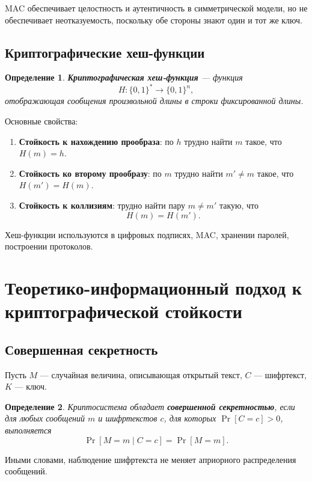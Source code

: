 \documentclass[12pt,a4paper]{article}
\newtheorem{definition}{Определение}
\begin{document}
MAC обеспечивает целостность и аутентичность в симметрической модели, но не обеспечивает неотказуемость, поскольку обе стороны знают один и тот же ключ.

\subsection{Криптографические хеш-функции}

\begin{definition}
\textbf{Криптографическая хеш-функция} --- функция
\[
    H : \{0,1\}^* \to \{0,1\}^n,
\]
отображающая сообщения произвольной длины в строки фиксированной длины.
\end{definition}

Основные свойства:

\begin{enumerate}
    \item \textbf{Стойкость к нахождению прообраза}: по $h$ трудно найти $m$ такое, что $H(m)=h$.
    \item \textbf{Стойкость ко второму прообразу}: по $m$ трудно найти $m' \ne m$ такое, что $H(m')=H(m)$.
    \item \textbf{Стойкость к коллизиям}: трудно найти пару $m \ne m'$ такую, что
    \[
        H(m)=H(m').
    \]
\end{enumerate}

Хеш-функции используются в цифровых подписях, MAC, хранении паролей, построении протоколов.

\section{Теоретико-информационный подход к криптографической стойкости}

\subsection{Совершенная секретность}

Пусть $M$ --- случайная величина, описывающая открытый текст, $C$ --- шифртекст, $K$ --- ключ.

\begin{definition}
Криптосистема обладает \textbf{совершенной секретностью}, если для любых сообщений $m$ и шифртекстов $c$, для которых $\Pr[C=c]>0$, выполняется
\[
    \Pr[M=m \mid C=c] = \Pr[M=m].
\]
\end{definition}

Иными словами, наблюдение шифртекста не меняет априорного распределения сообщений.
\end{document}
